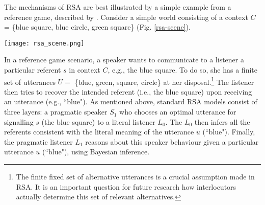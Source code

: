 The mechanisms of RSA are best illustrated by a simple example from a reference game, described by \textcite{frank2012predicting}.
Consider a simple world consisting of a context $C$ = \{blue square, blue circle, green square\} (Fig. \ref{rsa-scene}).
\begin{figure*}[t]
	\begin{center}
		\texttt{[image: rsa\_scene.png]}
	\end{center}
	\vspace{-0.3cm}
	\caption{A simple reference resolution example scenario: the context $C$ consists of three possible referents \parencite{frank2012predicting}}
	\label{rsa-scene}
\end{figure*}
In a reference game scenario, a speaker wants to communicate to a listener a particular referent $s$ in context $C$, e.g., the blue square. To do so, she has a finite set of utterances $U =$ \{blue, green, square, circle\} at her disposal.\footnote{The finite fixed set of alternative utterances is a crucial assumption made in RSA. It is an important question for future research how interlocutors actually determine this set of relevant alternatives.} The listener then tries to recover the intended referent (i.e., the blue square) upon receiving an utterance (e.g., ``blue"). 
As mentioned above, standard RSA models consist of three layers: a pragmatic speaker $S_1$ who chooses an optimal utterance for signalling $s$ (the blue square) to a literal listener $L_0$. The $L_0$ then infers all the referents consistent with the literal meaning of the utterance $u$ (``blue"). Finally, the pragmatic listener $L_1$ reasons about this speaker behaviour given a particular utterance $u$ (``blue"), using Bayesian inference.

